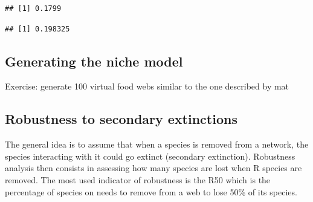 \documentclass[
]{book}
\newenvironment{Shaded}{\begin{snugshade}}{\end{snugshade}}
\newcommand{\ControlFlowTok}[1]{\textcolor[rgb]{0.13,0.29,0.53}{\textbf{#1}}}
\newcommand{\DecValTok}[1]{\textcolor[rgb]{0.00,0.00,0.81}{#1}}
\newcommand{\FloatTok}[1]{\textcolor[rgb]{0.00,0.00,0.81}{#1}}
\newcommand{\FunctionTok}[1]{\textcolor[rgb]{0.13,0.29,0.53}{\textbf{#1}}}
\newcommand{\NormalTok}[1]{#1}
\newcommand{\OtherTok}[1]{\textcolor[rgb]{0.56,0.35,0.01}{#1}}
\newcommand{\SpecialCharTok}[1]{\textcolor[rgb]{0.81,0.36,0.00}{\textbf{#1}}}
\theoremstyle{definition}
\theoremstyle{definition}
\theoremstyle{definition}
\theoremstyle{definition}
\theoremstyle{remark}
\begin{document}
\begin{verbatim}
## [1] 0.1799
\end{verbatim}

\begin{Shaded}
\end{Shaded}

\begin{verbatim}
## [1] 0.198325
\end{verbatim}

\subsection{Generating the niche model}\label{generating-the-niche-model}

Exercise: generate 100 virtual food webs similar to the one described by mat

\begin{Shaded}
\end{Shaded}

\subsection{Robustness to secondary extinctions}\label{robustness-to-secondary-extinctions}

The general idea is to assume that when a species is removed from a network, the species interacting with it could go extinct (secondary extinction).
Robustness analysis then consists in assessing how many species are lost when R species are removed.
The most used indicator of robustness is the R50 which is the percentage of species on needs to remove from a web to lose 50\% of its species.
\end{document}
